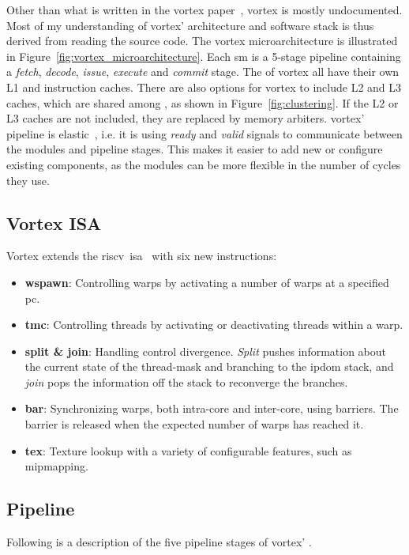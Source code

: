 Other than what is written in the \Gls{vortex} paper~\cite{Aurud_Project}, \Gls{vortex} is mostly undocumented. Most of my understanding of \Gls{vortex}' architecture and software stack is thus derived from reading the source code. The \Gls{vortex} microarchitecture is illustrated in Figure~\ref{fig:vortex_microarchitecture}. Each \acrshort{sm} is a 5-stage pipeline containing a \textit{fetch}, \textit{decode}, \textit{issue}, \textit{execute} and \textit{commit} stage. The  of \Gls{vortex} all have their own L1 and instruction caches. There are also options for \Gls{vortex} to include L2 and L3 caches, which are shared among , as shown in Figure~\ref{fig:clustering}. If the L2 or L3 caches are not included, they are replaced by memory arbiters. \Gls{vortex}' pipeline is elastic~\cite{elastic_pipeline}, i.e. it is using \textit{ready} and \textit{valid} signals to communicate between the modules and pipeline stages. This makes it easier to add new or configure existing components, as the modules can be more flexible in the number of cycles they use.

\subsection{Vortex ISA}

Vortex extends the \gls{riscv}~\acrshort{isa}~\cite{riscv-isa} with six new instructions:
\begin{itemize}
    \item \textbf{wspawn}: Controlling warps by activating a number of warps at a specified \acrshort{pc}.
    \item \textbf{tmc}: Controlling threads by activating or deactivating threads within a warp. 
    \item \textbf{split \& join}: Handling control divergence. \textit{Split} pushes information about the current state of the thread-mask and branching to the \acrfull{ipdom} stack, and \textit{join} pops the information off the stack to reconverge the branches.
    \item \textbf{bar}: Synchronizing warps, both intra-core and inter-core, using barriers. The barrier is released when the expected number of warps has reached it.  
    \item \textbf{tex}: Texture lookup with a variety of configurable features, such as mipmapping. 
\end{itemize}

\subsection{Pipeline} \label{sec:vortex_pipeline}
Following is a description of the five pipeline stages of \Gls{vortex}' .

